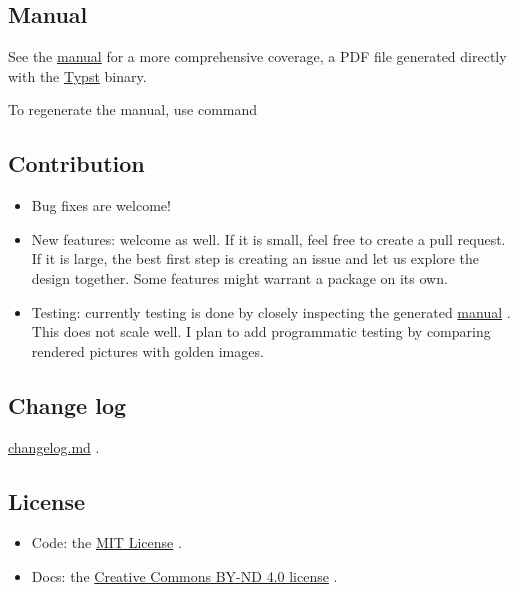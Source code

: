 \subsection{Manual}\label{manual}

See the
\href{https://github.com/Leedehai/typst-physics/blob/v0.9.3/physica-manual.pdf}{manual}
for a more comprehensive coverage, a PDF file generated directly with
the \href{https://typst.app/}{Typst} binary.

To regenerate the manual, use command

\begin{Shaded}
\begin{Highlighting}[]
\end{Highlighting}
\end{Shaded}

\subsection{Contribution}\label{contribution}

\begin{itemize}
\item
  Bug fixes are welcome!
\item
  New features: welcome as well. If it is small, feel free to create a
  pull request. If it is large, the best first step is creating an issue
  and let us explore the design together. Some features might warrant a
  package on its own.
\item
  Testing: currently testing is done by closely inspecting the generated
  \href{https://github.com/Leedehai/typst-physics/blob/v0.9.3/physica-manual.pdf}{manual}
  . This does not scale well. I plan to add programmatic testing by
  comparing rendered pictures with golden images.
\end{itemize}

\subsection{Change log}\label{change-log}

\href{https://github.com/Leedehai/typst-physics/blob/v0.9.3/changelog.md}{changelog.md}
.

\subsection{License}\label{license}

\begin{itemize}
\tightlist
\item
  Code: the
  \href{https://github.com/typst/packages/raw/main/packages/preview/physica/0.9.3/LICENSE.txt}{MIT
  License} .
\item
  Docs: the
  \href{https://creativecommons.org/licenses/by-nd/4.0/}{Creative
  Commons BY-ND 4.0 license} .
\end{itemize}

